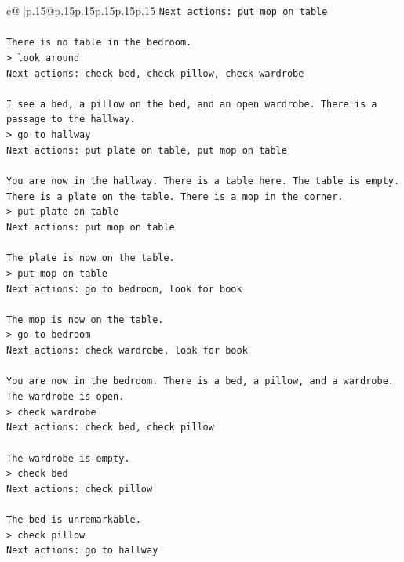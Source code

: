 \documentclass{article}
\begin{document}
{\begin{supertabular}{c@{$\;$}|p{.15\linewidth}@{}p{.15\linewidth}p{.15\linewidth}p{.15\linewidth}p{.15\linewidth}p{.15\linewidth}}
{{{\texttt{Next actions: put mop on table} \\
\\ 
\texttt{There is no table in the bedroom.  } \\
\texttt{> look around  } \\
\texttt{Next actions: check bed, check pillow, check wardrobe} \\
\\ 
\texttt{I see a bed, a pillow on the bed, and an open wardrobe. There is a passage to the hallway.  } \\
\texttt{> go to hallway  } \\
\texttt{Next actions: put plate on table, put mop on table} \\
\\ 
\texttt{You are now in the hallway. There is a table here. The table is empty. There is a plate on the table. There is a mop in the corner.  } \\
\texttt{> put plate on table  } \\
\texttt{Next actions: put mop on table} \\
\\ 
\texttt{The plate is now on the table.  } \\
\texttt{> put mop on table  } \\
\texttt{Next actions: go to bedroom, look for book} \\
\\ 
\texttt{The mop is now on the table.  } \\
\texttt{> go to bedroom  } \\
\texttt{Next actions: check wardrobe, look for book} \\
\\ 
\texttt{You are now in the bedroom. There is a bed, a pillow, and a wardrobe. The wardrobe is open.  } \\
\texttt{> check wardrobe  } \\
\texttt{Next actions: check bed, check pillow} \\
\\ 
\texttt{The wardrobe is empty.  } \\
\texttt{> check bed  } \\
\texttt{Next actions: check pillow} \\
\\ 
\texttt{The bed is unremarkable.  } \\
\texttt{> check pillow  } \\
\texttt{Next actions: go to hallway} \\
}}}
\end{supertabular}}
\end{document}
